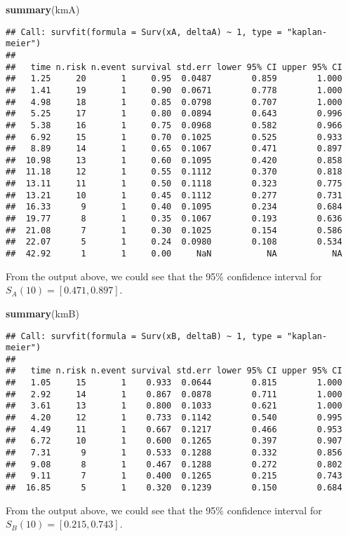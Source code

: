 \documentclass[]{article}
\newenvironment{Shaded}{\begin{snugshade}}{\end{snugshade}}
\newcommand{\KeywordTok}[1]{\textcolor[rgb]{0.13,0.29,0.53}{\textbf{#1}}}
\newcommand{\NormalTok}[1]{#1}
\begin{document}
\begin{Shaded}
\begin{Highlighting}[]
\KeywordTok{summary}\NormalTok{(kmA)}
\end{Highlighting}
\end{Shaded}

\begin{verbatim}
## Call: survfit(formula = Surv(xA, deltaA) ~ 1, type = "kaplan-meier")
## 
##   time n.risk n.event survival std.err lower 95% CI upper 95% CI
##   1.25     20       1     0.95  0.0487        0.859        1.000
##   1.41     19       1     0.90  0.0671        0.778        1.000
##   4.98     18       1     0.85  0.0798        0.707        1.000
##   5.25     17       1     0.80  0.0894        0.643        0.996
##   5.38     16       1     0.75  0.0968        0.582        0.966
##   6.92     15       1     0.70  0.1025        0.525        0.933
##   8.89     14       1     0.65  0.1067        0.471        0.897
##  10.98     13       1     0.60  0.1095        0.420        0.858
##  11.18     12       1     0.55  0.1112        0.370        0.818
##  13.11     11       1     0.50  0.1118        0.323        0.775
##  13.21     10       1     0.45  0.1112        0.277        0.731
##  16.33      9       1     0.40  0.1095        0.234        0.684
##  19.77      8       1     0.35  0.1067        0.193        0.636
##  21.08      7       1     0.30  0.1025        0.154        0.586
##  22.07      5       1     0.24  0.0980        0.108        0.534
##  42.92      1       1     0.00     NaN           NA           NA
\end{verbatim}

From the output above, we could see that the 95\% confidence interval
for \(S_A(10) = [0.471, 0.897]\).

\begin{Shaded}
\begin{Highlighting}[]
\KeywordTok{summary}\NormalTok{(kmB)}
\end{Highlighting}
\end{Shaded}

\begin{verbatim}
## Call: survfit(formula = Surv(xB, deltaB) ~ 1, type = "kaplan-meier")
## 
##   time n.risk n.event survival std.err lower 95% CI upper 95% CI
##   1.05     15       1    0.933  0.0644        0.815        1.000
##   2.92     14       1    0.867  0.0878        0.711        1.000
##   3.61     13       1    0.800  0.1033        0.621        1.000
##   4.20     12       1    0.733  0.1142        0.540        0.995
##   4.49     11       1    0.667  0.1217        0.466        0.953
##   6.72     10       1    0.600  0.1265        0.397        0.907
##   7.31      9       1    0.533  0.1288        0.332        0.856
##   9.08      8       1    0.467  0.1288        0.272        0.802
##   9.11      7       1    0.400  0.1265        0.215        0.743
##  16.85      5       1    0.320  0.1239        0.150        0.684
\end{verbatim}

From the output above, we could see that the 95\% confidence interval
for \(S_B(10) = [0.215, 0.743]\).
\end{document}
